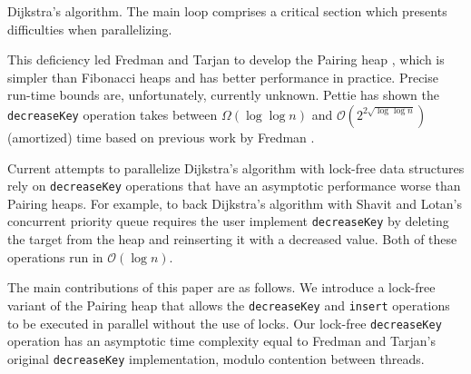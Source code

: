 \documentclass{acm_proc_article-sp}
\begin{document}
\begin{algorithm}[h]
\caption{Dijkstra's algorithm. The main loop comprises a critical section which presents difficulties when parallelizing.}
\label{alg:dijk}
\end{algorithm}

This deficiency led Fredman and Tarjan to develop the Pairing heap \cite{fredman86}, which
is simpler than Fibonacci heaps and has better performance in practice. Precise run-time bounds are, unfortunately, currently unknown. 
Pettie \cite{pettie05} has shown the \texttt{decreaseKey} operation takes between $\Omega(\log \log n)$ and $\mathcal{O}(2^{2\sqrt{\log\log n}})$ (amortized) time based on previous work by Fredman \cite{fredman99}.

Current attempts
to parallelize Dijkstra's algorithm with lock-free data structures
rely on \texttt{decreaseKey} operations that have an asymptotic performance
worse than Pairing heaps. For example, to back Dijkstra's algorithm with Shavit and Lotan's
concurrent priority queue \cite{shavit00} requires the user implement \texttt{decreaseKey} by deleting 
the target from the heap and reinserting it with a decreased value. Both of these operations run in
$\mathcal{O}(\log n)$.

The main contributions of this paper are as follows.
We introduce a lock-free variant of the Pairing heap
that allows the \texttt{decreaseKey} and \texttt{insert} operations
to be executed in parallel
without the use of locks.
Our lock-free \texttt{decreaseKey} operation has an asymptotic time complexity
equal to Fredman and Tarjan's \cite{fredman86} original \texttt{decreaseKey} implementation,
modulo contention between threads.
\end{document}
